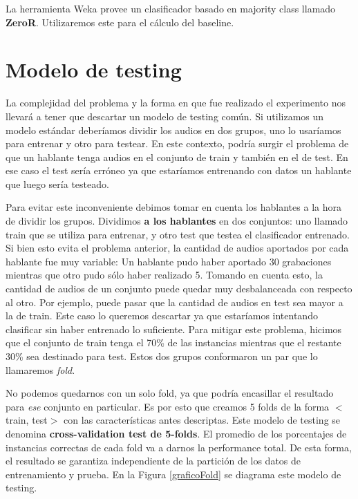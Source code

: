La herramienta Weka provee un clasificador basado en majority class llamado \textbf{ZeroR}. Utilizaremos este para el cálculo del baseline. 

\section{Modelo de testing}


La complejidad del problema y la forma en que fue realizado el experimento nos llevará a tener que descartar un modelo de testing común. Si utilizamos un modelo estándar deberíamos dividir los audios en dos grupos, uno lo usaríamos para entrenar y otro para testear. En este contexto, podría surgir el problema de que un hablante tenga audios en el conjunto de train y también en el de test. En ese caso el test sería erróneo ya que estaríamos entrenando con datos un hablante que luego sería testeado.

Para evitar este inconveniente debimos tomar en cuenta los hablantes a la hora de dividir los grupos. Dividimos \textbf{a los hablantes} en dos conjuntos: uno llamado train que se utiliza para entrenar, y otro test que testea el clasificador entrenado. Si bien esto evita el problema anterior, la cantidad de audios aportados por cada hablante fue muy variable: Un hablante pudo haber aportado 30 grabaciones mientras que otro pudo sólo haber realizado 5. Tomando en cuenta esto, la cantidad de audios de un conjunto puede quedar muy desbalanceada con respecto al otro. Por ejemplo, puede pasar que la cantidad de audios en test sea mayor a la de train. Este caso lo queremos descartar ya que estaríamos intentando clasificar sin haber entrenado lo suficiente. Para mitigar este problema, hicimos que el conjunto de train tenga el 70\% de las instancias mientras que el restante 30\% sea destinado para test. Estos dos grupos conformaron un par que lo llamaremos \textit{fold}.

No podemos quedarnos con un solo fold, ya que podría encasillar el resultado para \textit{ese} conjunto en particular. Es por esto que creamos 5 folds de la forma $<$train, test$>$ con las características antes descriptas. Este modelo de testing se denomina \textbf{cross-validation test de 5-folds}. El promedio de los porcentajes de instancias correctas de cada fold va a darnos la performance total. De esta forma, el resultado se garantiza independiente de la partición de los datos de entrenamiento y prueba. En la Figura \ref{graficoFold} se diagrama este modelo de testing.

